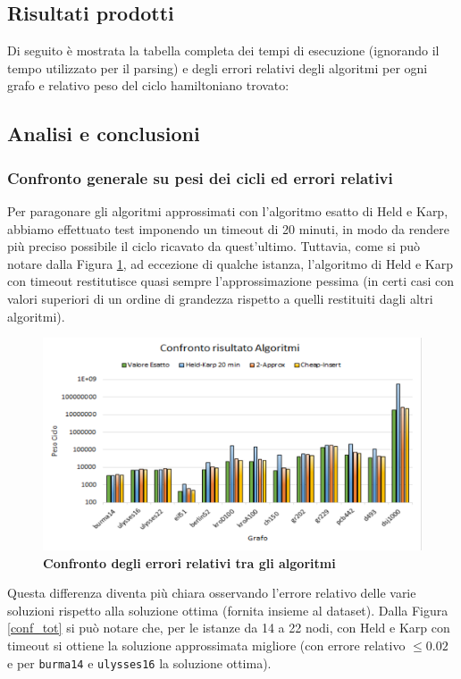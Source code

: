 \documentclass[]{article}
\begin{document}
\subsection{Risultati prodotti}
\begin{flushleft}
Di seguito è mostrata la tabella completa dei tempi di esecuzione (ignorando il tempo utilizzato per il parsing) e degli errori relativi degli algoritmi per ogni grafo e relativo peso del ciclo hamiltoniano trovato: 



\subsection{Analisi e conclusioni}
\subsubsection{Confronto generale su pesi dei cicli ed errori relativi}
Per paragonare gli algoritmi approssimati con l'algoritmo esatto di Held e Karp, abbiamo effettuato test imponendo un timeout di 20 minuti, in modo da rendere più preciso possibile il ciclo ricavato da quest'ultimo. Tuttavia, come si può notare dalla Figura \ref{total}, ad eccezione di qualche istanza, l'algoritmo di Held e Karp con timeout restitutisce quasi sempre l'approssimazione pessima (in certi casi con valori superiori di un ordine di grandezza rispetto a quelli restituiti dagli altri algoritmi).
\begin{figure}[H]
	\centering
	\includegraphics[width=\textwidth,height=\textheight,keepaspectratio]{CONFRONTO_RISULTATI.png}
	\caption{\textbf{Confronto degli errori relativi tra gli algoritmi}}
	\label{total}
\end{figure}
Questa differenza diventa più chiara osservando l'errore relativo delle varie soluzioni rispetto alla soluzione ottima (fornita insieme al dataset). Dalla Figura \ref{conf_tot} si può notare che, per le istanze da 14 a 22 nodi, con Held e Karp con timeout si ottiene la soluzione approssimata migliore (con errore relativo $\leq 0.02$ e per \verb|burma14| e \verb|ulysses16| la soluzione ottima).\\

\end{flushleft}
\end{document}
